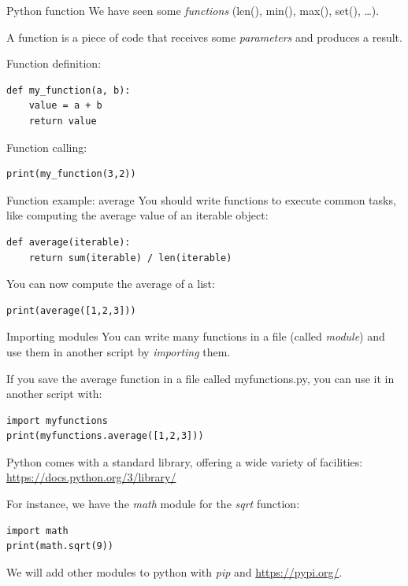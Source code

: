 \documentclass[aspectratio=169,]{beamer}
\begin{document}
\begin{frame}[fragile]{Python function}
    We have seen some \emph{functions} (len(), min(), max(), set(), \ldots).

    A function is a piece of code that receives some \emph{parameters} and produces a result.

    \begin{minipage}{0.49\textwidth}
        Function definition:
        \begin{verbatim}
def my_function(a, b):
    value = a + b
    return value
        \end{verbatim}
    \end{minipage}
    \begin{minipage}{0.49\textwidth}
        Function calling:
        \begin{verbatim}
print(my_function(3,2))
        \end{verbatim}
    \end{minipage}
\end{frame}

\begin{frame}[fragile]{Function example: average}
    You should write functions to execute common tasks, like computing the average value of an iterable object:

        \begin{verbatim}
def average(iterable):
    return sum(iterable) / len(iterable)
        \end{verbatim}

        You can now compute the average of a list:
        \begin{verbatim}
print(average([1,2,3]))
        \end{verbatim}
\end{frame}

\begin{frame}[fragile]{Importing modules}
    You can write many functions in a file (called \emph{module}) and use them in another script by \emph{importing}
    them.

    If you save the average function in a file called myfunctions.py, you can use it in another script with:
    \begin{verbatim}
import myfunctions
print(myfunctions.average([1,2,3]))
    \end{verbatim}

    Python comes with a standard library, offering a wide variety of facilities:
    \url{https://docs.python.org/3/library/}

    For instance, we have the \emph{math} module for the \emph{sqrt} function:
    \begin{verbatim}
import math
print(math.sqrt(9))
    \end{verbatim}

    We will add other modules to python with \emph{pip} and \url{https://pypi.org/}.
\end{frame}
\end{document}
